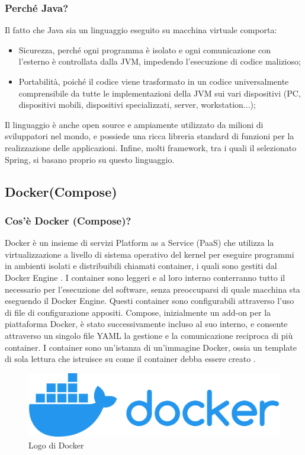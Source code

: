             \subsubsection{Perché Java?}
                Il fatto che Java sia un linguaggio eseguito su macchina virtuale comporta:
                \begin{itemize}
                    \item Sicurezza, perché ogni programma è isolato e ogni comunicazione con l'esterno è controllata dalla JVM, impedendo l'esecuzione di codice malizioso;
                    \item Portabilità, poiché il codice viene trasformato in un codice universalmente comprensibile da tutte le implementazioni della JVM sui vari dispositivi (PC, dispositivi mobili, dispositivi specializzati, server, workstation...);
                \end{itemize}
                Il linguaggio è anche open source e ampiamente utilizzato da milioni di sviluppatori nel mondo, e possiede una ricca libreria standard di funzioni per la realizzazione delle applicazioni. Infine, molti framework, tra i quali il selezionato Spring, si basano proprio su questo linguaggio.
                
        \subsection{Docker(Compose)}
            \subsubsection{Cos'è Docker (Compose)?}
                Docker è un insieme di servizi Platform as a Service (PaaS) che utilizza la virtualizzazione a livello di sistema operativo del kernel per eseguire programmi in ambienti isolati e distribuibili chiamati container, i quali sono gestiti dal Docker Engine \cite{Wikipedia5}. I container sono leggeri e al loro interno conterranno tutto il necessario per l'esecuzione del software, senza preoccuparsi di quale macchina sta eseguendo il Docker Engine. Questi container sono configurabili attraverso l'uso di file di configurazione appositi. Compose, inizialmente un add-on per la piattaforma Docker, è stato successivamente incluso al suo interno, e consente attraverso un singolo file YAML la gestione e la comunicazione reciproca di più container. I container sono un'istanza di un'immagine Docker, ossia un template di sola lettura che istruisce su come il container debba essere creato \cite{Docker1}.
            \begin{figure}[htbp!]
                \centering
                \includegraphics[width=0.5\linewidth]{Immagini/System Design/Docker.png}
                \caption{Logo di Docker}
            \end{figure}
